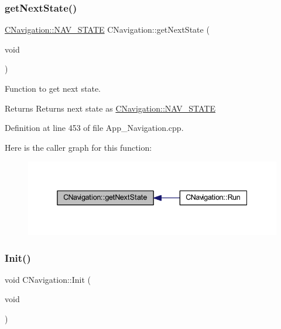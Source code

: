\subsubsection{\texorpdfstring{get\+Next\+State()}{getNextState()}}
{\footnotesize\ttfamily \mbox{\hyperlink{class_c_navigation_add9fc966c7604990edf5c2a2e0eba32c}{C\+Navigation\+::\+N\+A\+V\+\_\+\+S\+T\+A\+TE}} C\+Navigation\+::get\+Next\+State (\begin{DoxyParamCaption}\item[{void}]{ }\end{DoxyParamCaption})\hspace{0.3cm}{\ttfamily [virtual]}}



Function to get next state. 

\begin{DoxyReturn}{Returns}
Returns next state as \mbox{\hyperlink{class_c_navigation_add9fc966c7604990edf5c2a2e0eba32c}{C\+Navigation\+::\+N\+A\+V\+\_\+\+S\+T\+A\+TE}} 
\end{DoxyReturn}


Definition at line 453 of file App\+\_\+\+Navigation.\+cpp.

Here is the caller graph for this function\+:\nopagebreak
\begin{figure}[H]
\begin{center}
\leavevmode
\includegraphics[width=338pt]{class_c_navigation_afef253f37646558a755d956ecf2fc6e9_icgraph}
\end{center}
\end{figure}
\mbox{\label{class_c_navigation_a86a0756663ccf76e9c474764b8f7a04f}} 
\subsubsection{\texorpdfstring{Init()}{Init()}}
{\footnotesize\ttfamily void C\+Navigation\+::\+Init (\begin{DoxyParamCaption}\item[{void}]{ }\end{DoxyParamCaption})\hspace{0.3cm}{\ttfamily [virtual]}}



